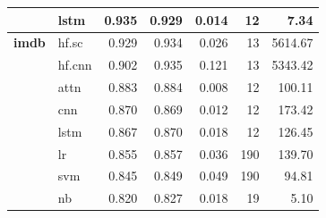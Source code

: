 \documentclass[final]{clv2025-revised}
\begin{document}
\begin{table}[h!]
{\begin{tabular}{@{}p{2cm}p{1.2cm}rrrrr@{}}
 & lstm & 0.935 & 0.929 & 0.014 & 12 & 7.34 \\
\midrule
\textbf{imdb} & hf.sc & 0.929 & 0.934 & 0.026 & 13 & 5614.67 \\
 & hf.cnn & 0.902 & 0.935 & 0.121 & 13 & 5343.42 \\
 & attn & 0.883 & 0.884 & 0.008 & 12 & 100.11 \\
 & cnn & 0.870 & 0.869 & 0.012 & 12 & 173.42 \\
 & lstm & 0.867 & 0.870 & 0.018 & 12 & 126.45 \\
 & lr & 0.855 & 0.857 & 0.036 & 190 & 139.70 \\
 & svm & 0.845 & 0.849 & 0.049 & 190 & 94.81 \\
 & nb & 0.820 & 0.827 & 0.018 & 19 & 5.10 \\
\bottomrule
\end{tabular}%
}
\end{table}
\end{document}
